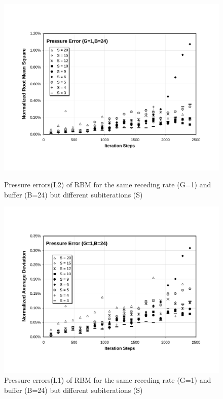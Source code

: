 \cp

\begin{figure}[htbp]
  \begin{center}    \includegraphics[scale=0.6]{../figures/Exp3-CASE1-dt0.005/G_1_B_24/G1-B24-P-NRMS.pdf}
    \caption{Pressure errors(L2) of RBM for the same receding rate (G=1) and buffer (B=24) but different subiterations (S)}
        \vspace{0.5in}
\includegraphics[scale=0.6]{../figures/Exp3-CASE1-dt0.005/G_1_B_24/G1-B24-P-NAD.pdf}
    \caption{Pressure errors(L1) of RBM for the same receding rate (G=1) and buffer (B=24) but different subiterations (S)}
  \end{center}
\end{figure}

